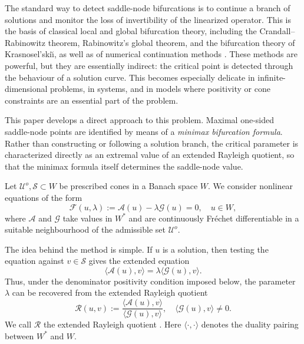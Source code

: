 \documentclass[preprint,10pt]{elsarticle}
\numberwithin{equation}{section}
\begin{document}
The standard way to detect saddle-node bifurcations is to continue a branch of
solutions and monitor the loss of invertibility of the linearized operator.
This is the basis of classical local and global bifurcation theory, including
the Crandall--Rabinowitz theorem, Rabinowitz's global theorem, and the
bifurcation theory of Krasno\-sel'ski\u{\i}, as well as of numerical
continuation methods
\cite{CranRibin,keller1,kielh,Kuznet,Seid,Rabin1971,KrasnosBif}. These
methods are powerful, but they are essentially indirect: the critical point is
detected through the behaviour of a solution curve. This becomes especially
delicate in infinite-dimensional problems, in systems, and in models where
positivity or cone constraints are an essential part of the problem.

This paper develops a direct approach to this problem. Maximal one-sided
saddle-node points are identified by means of a \emph{minimax bifurcation
	formula}. Rather than constructing or following a solution branch, the
critical parameter is characterized directly as an extremal value of an
extended Rayleigh quotient, so that the minimax formula itself determines the
saddle-node value.

Let \(\mathcal U^o,\mathcal S\subset W\) be prescribed cones in a Banach
space \(W\). We consider nonlinear equations of the form
\begin{equation}
	\label{Gf-intro}
	\mathcal F(u,\lambda)
	:=
	\mathcal A(u)-\lambda\mathcal G(u)=0,\quad u\in W,
\end{equation}
where \(\mathcal A\) and \(\mathcal G\) take values in \(W^*\) and are
continuously Fr\'echet differentiable in a suitable neighbourhood of the
admissible set \(\mathcal U^o\).

The idea behind the method is simple. If \(u\) is a solution, then testing the
equation against \(v\in\mathcal S\) gives the extended equation
\cite{IlyasFunc}
\[
\langle\mathcal A(u),v\rangle
=
\lambda \langle\mathcal G(u),v\rangle .
\]
Thus, under the denominator positivity condition imposed below, the parameter
\(\lambda\) can be recovered from the extended Rayleigh quotient
\[
\mathcal R(u,v)
:=
\frac{\langle\mathcal A(u),v\rangle}
{\langle\mathcal G(u),v\rangle},\quad \langle\mathcal G(u),v\rangle \neq 0.
\]
We call \(\mathcal R\) the extended Rayleigh quotient
\cite{IlyasJDE24}. Here \(\langle\cdot,\cdot\rangle\) denotes the duality
pairing between \(W^*\) and \(W\).
\end{document}
